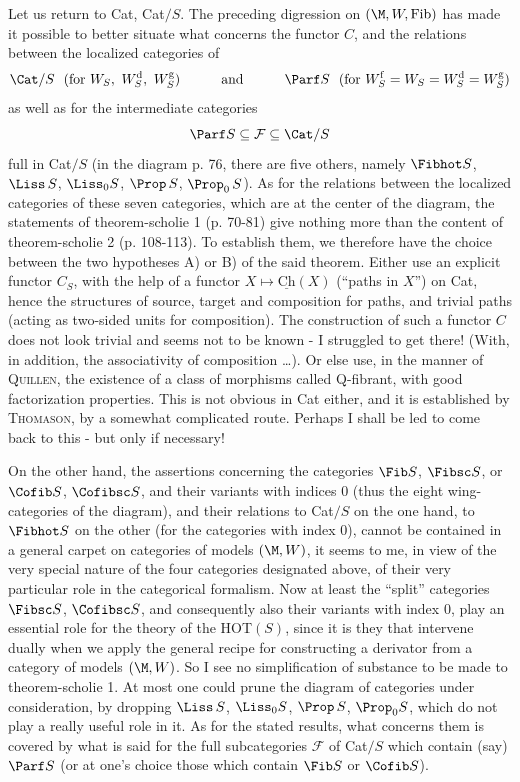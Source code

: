 Let us return to Cat, Cat$/S$. The preceding digression on $(\M, W, \mathrm{Fib})$ has made it possible to better situate what concerns the functor $C$, and the relations between the localized categories of
\[\Cat/S \ \ (\text{for } W_S,\ W_S^{\mathrm{d}},\ W_S^{\mathrm{g}}) \qquad\quad \text{and} \qquad\quad \Parf S \ \ (\text{for } W_S^{\mathrm{f}} = W_S = W_S^{\mathrm{d}} = W_S^{\mathrm{g}})\]
as well as for the intermediate categories
\[\Parf S \subseteq \mathcal{F} \subseteq \Cat/S\]
full in Cat$/S$ (in the diagram p. 76, there are five others, namely $\Fibhot S$, $\Liss\,S$, $\Liss_0 S$, $\Prop\,S$, $\Prop_0\,S$). As for the relations between the localized categories of these seven categories, which are at the center of the diagram, the statements of theorem-scholie 1 (p. 70-81) give nothing more than the content of theorem-scholie 2 (p. 108-113). To establish them, we therefore have the choice between the two hypotheses A) or B) of the said theorem. Either use an explicit functor $C_S$, with the help of a
functor $X \longmapsto \underline{\mathrm{Ch}}(X)$ (``paths in $X$'') on Cat, hence the structures of source, target and composition for paths, and trivial paths (acting as two-sided units for composition). The construction of such a functor $C$ does not look trivial and seems not to be known - I struggled to get there! (With, in addition, the associativity of composition \ldots). Or else use, in the manner of \textsc{Quillen}, the existence of a class of morphisms called Q-fibrant, with good factorization properties. This is not obvious in Cat either, and it is established by \textsc{Thomason}, by a somewhat complicated route. Perhaps I shall be led to come back to this - but only if necessary! %

On the other hand, the assertions concerning the categories $\Fib S$, $\Fibsc S$, or $\Cofib S$, $\Cofibsc S$, and their variants with indices 0 (thus the eight wing-categories of the diagram), and their relations to Cat$/S$ on the one hand, to $\Fibhot S$ on the other (for the categories with index 0), cannot be contained in a general carpet on categories of models $(\M, W)$, it seems to me, in view of the very special nature of the four categories designated above, of their very particular role in the categorical formalism. Now at least the ``split'' categories $\Fibsc S$, $\Cofibsc S$, and consequently also their variants with index 0, play an essential role for the theory of the HOT$(S)$, since it is they that
intervene dually when we apply the general recipe for constructing a derivator from a category of models $(\M, W)$. So I see no simplification
of substance to be made to theorem-scholie 1. At most one could prune the diagram of categories under consideration, by dropping $\Liss\,S$, $\Liss_0 S$, $\Prop\,S$, $\Prop_0 S$, which do not play a really useful role in it. As for the stated results, what concerns them is covered by what is said for the full subcategories $\mathcal{F}$ of Cat$/S$ which contain (say) $\Parf S$ (or at one's choice those which contain $\Fib S$ or $\Cofib S$).

